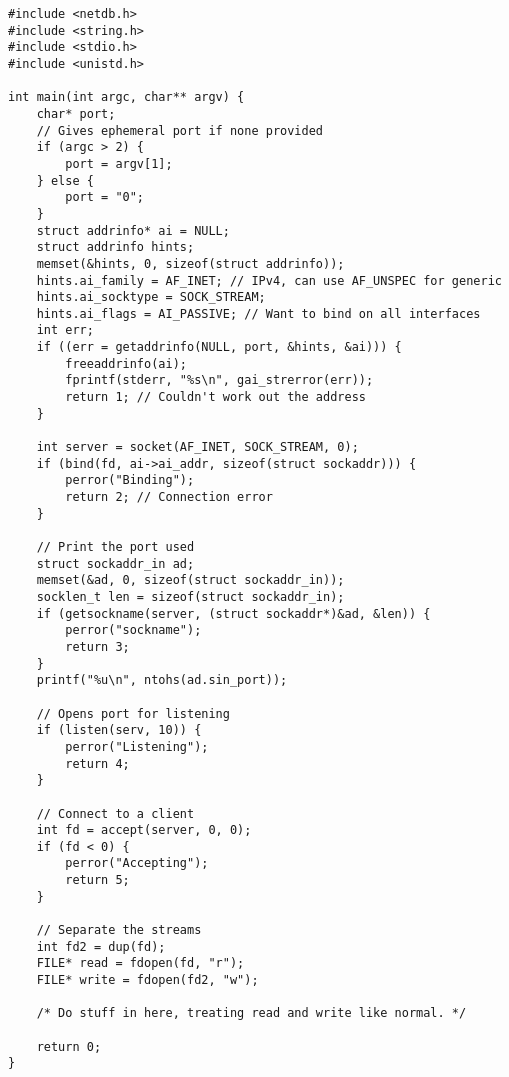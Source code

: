 \documentclass{article}
\begin{document}
\begin{verbatim}
#include <netdb.h>
#include <string.h>
#include <stdio.h>
#include <unistd.h>

int main(int argc, char** argv) {
    char* port;
    // Gives ephemeral port if none provided
    if (argc > 2) {
        port = argv[1];
    } else {
        port = "0";
    }
    struct addrinfo* ai = NULL;
    struct addrinfo hints;
    memset(&hints, 0, sizeof(struct addrinfo));
    hints.ai_family = AF_INET; // IPv4, can use AF_UNSPEC for generic
    hints.ai_socktype = SOCK_STREAM;
    hints.ai_flags = AI_PASSIVE; // Want to bind on all interfaces
    int err;
    if ((err = getaddrinfo(NULL, port, &hints, &ai))) {
        freeaddrinfo(ai);
        fprintf(stderr, "%s\n", gai_strerror(err));
        return 1; // Couldn't work out the address
    }

    int server = socket(AF_INET, SOCK_STREAM, 0);
    if (bind(fd, ai->ai_addr, sizeof(struct sockaddr))) {
        perror("Binding");
        return 2; // Connection error
    }

    // Print the port used
    struct sockaddr_in ad;
    memset(&ad, 0, sizeof(struct sockaddr_in));
    socklen_t len = sizeof(struct sockaddr_in);
    if (getsockname(server, (struct sockaddr*)&ad, &len)) {
        perror("sockname");
        return 3;
    }
    printf("%u\n", ntohs(ad.sin_port));

    // Opens port for listening
    if (listen(serv, 10)) {
        perror("Listening");
        return 4;
    }

    // Connect to a client
    int fd = accept(server, 0, 0);
    if (fd < 0) {
        perror("Accepting");
        return 5;
    }

    // Separate the streams
    int fd2 = dup(fd);
    FILE* read = fdopen(fd, "r");
    FILE* write = fdopen(fd2, "w");

    /* Do stuff in here, treating read and write like normal. */

    return 0;
}
\end{verbatim}
\end{document}
